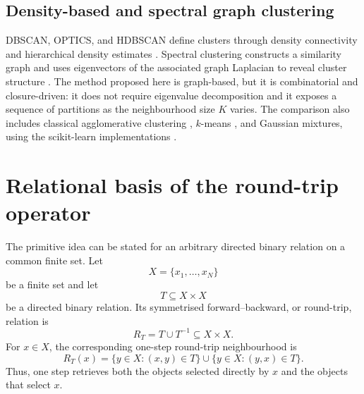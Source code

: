 \documentclass[pdflatex,sn-mathphys-num]{sn-jnl}
\begin{document}
\subsection{Density-based and spectral graph clustering}

DBSCAN, OPTICS, and HDBSCAN define clusters through density connectivity and hierarchical density estimates \citep{Ester1996DBSCAN,Ankerst1999OPTICS,Campello2013HDBSCAN,CampelloMoulaviZimekSander2015}. Spectral clustering constructs a similarity graph and uses eigenvectors of the associated graph Laplacian to reveal cluster structure \citep{NgJordanWeiss2002,VonLuxburg2007}. The method proposed here is graph-based, but it is combinatorial and closure-driven: it does not require eigenvalue decomposition and it exposes a sequence of partitions as the neighbourhood size $K$ varies.
The comparison also includes classical agglomerative clustering
\citep{MurtaghContreras2012}, $k$-means \citep{Lloyd1982,MacQueen1967}, and
Gaussian mixtures, using the scikit-learn implementations
\citep{PedregosaEtAl2011}.

\section{Relational basis of the round-trip operator}\label{sec:relational_origin}

The primitive idea can be stated for an arbitrary directed binary relation on
a common finite set.  Let
\begin{equation}
X=\{x_1,\ldots,x_N\}
\end{equation}
be a finite set and let
\begin{equation}
T\subseteq X\times X
\end{equation}
be a directed binary relation.  Its symmetrised forward--backward, or
round-trip, relation is
\begin{equation}
R_T=T\cup T^{-1}\subseteq X\times X.
\end{equation}
For $x\in X$, the corresponding one-step round-trip neighbourhood is
\begin{equation}
R_T(x)=\{y\in X:(x,y)\in T\}\cup\{y\in X:(y,x)\in T\}.
\label{eq:relational_roundtrip}
\end{equation}
Thus, one step retrieves both the objects selected directly by $x$ and the
objects that select $x$.
\end{document}
